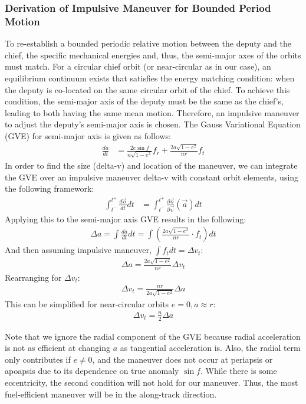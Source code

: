 \subsubsection{Derivation of Impulsive Maneuver for Bounded Period Motion}
To re-establish a bounded periodic relative motion between the deputy and the chief, the specific mechanical energies and, thus, the semi-major axes of the orbits must match. For a circular chief orbit (or near-circular as in our case), an equilibrium continuum exists that satisfies the energy matching condition: when the deputy is co-located on the same circular orbit of the chief. To achieve this condition, the semi-major axis of the deputy must be the same as the chief's, leading to both having the same mean motion. Therefore, an impulsive maneuver to adjust the deputy's semi-major axis is chosen. The Gauss Variational Equation (GVE) for semi-major axis is given as follows:
\begin{align}
\frac{da}{dt} &= \frac{2e \sin f}{n \sqrt{1 - e^2}} f_r + \frac{2a \sqrt{1 - e^2}}{n r} f_t
\end{align}
In order to find the size (delta-v) and location of the maneuver, we can integrate the GVE over an impulsive maneuver delta-v with constant orbit elements, using the following framework:
\begin{align}
\int_{t^-}^{t^+} \frac{d\vec{o}}{dt} dt &= \int_{t^-}^{t^+} \frac{\partial \vec{o}}{\partial \vec{v}} \left( \vec{a} \right) dt
\end{align}
Applying this to the semi-major axis GVE results in the following:
\begin{align}
\Delta a = \int \frac{da}{dt} dt = \int \left( \frac{2a \sqrt{1 - e^2}}{n r} \cdot f_t \right) dt
\end{align}
And then assuming impulsive maneuver, \( \int f_t dt = \Delta v_t \):
\begin{align}
\Delta a = \frac{2a \sqrt{1 - e^2}}{n r} \Delta v_t
\end{align}
Rearranging for $\Delta v_t$:
\begin{align}
\Delta v_t = \frac{n r}{2a \sqrt{1 - e^2}} \Delta a
\end{align}
This can be simplified for near-circular orbits \( e = 0, a \approx r \):
\begin{align}
\Delta v_t = \frac{n}{2} \Delta a
\end{align}

Note that we ignore the radial component of the GVE because radial acceleration is not as efficient at changing \( a \) as tangential acceleration is. Also, the radial term only contributes if \( e \neq 0 \), and the maneuver does not occur at periapsis or apoapsis due to its dependence on true anomaly \(\sin f\). While there is some eccentricity, the second condition will not hold for our maneuver. Thus, the most fuel-efficient maneuver will be in the along-track direction.

